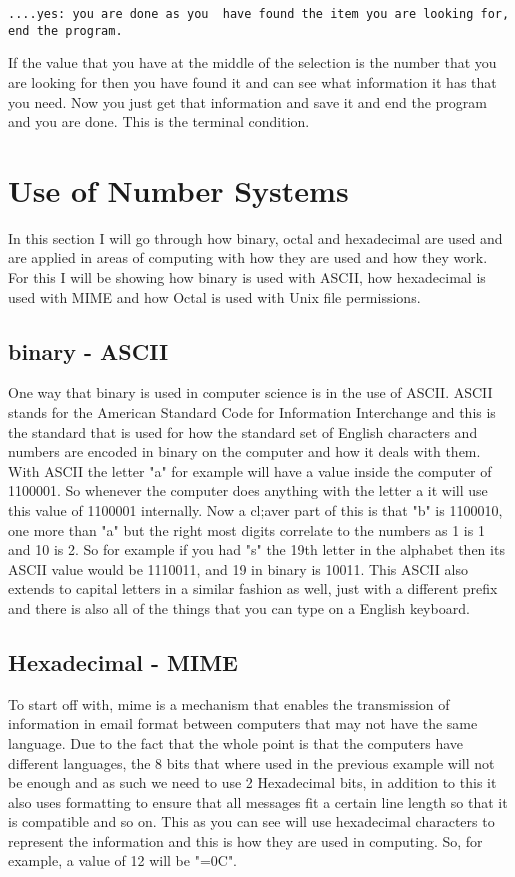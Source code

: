 \documentclass{article}
\begin{document}
\begin{verbatim}
....yes: you are done as you  have found the item you are looking for, end the program. 
\end{verbatim}
If the value that you have at the middle of the selection is the number that you are looking for then you have found it and can see what information it has that you need. Now you just get that information and save it and end the program and you are done. This is the terminal condition. 

\section{Use of Number Systems}
In this section I will go through how binary, octal and hexadecimal are used and are applied in areas of computing with how they are used and how they work. For this I will be showing how binary is used with ASCII, how hexadecimal is used with MIME and how Octal is used with Unix file permissions. 
\subsection{binary - ASCII}
One way that binary is used in computer science is in the use of ASCII. ASCII stands for the American Standard Code for Information Interchange and this is the standard that is used for how the standard set of English characters and numbers are encoded in binary on the computer and how it deals with them. With ASCII the letter "a" for example will have a value inside the computer of 1100001. So whenever the computer does anything with the letter a it will use this value of 1100001 internally. Now a cl;aver part of this is that "b" is 1100010, one more than "a" but the right most digits correlate to the numbers as 1 is 1 and 10 is 2. So for example if you had "s" the 19th letter in the alphabet then its ASCII value would be 1110011, and 19 in binary is 10011. This ASCII also extends to capital letters in a similar fashion as well, just with a different prefix and there is also all of the things that you can type on a English keyboard.  
\subsection{Hexadecimal - MIME}
To start off with, mime is a mechanism that enables the transmission of information in email format between computers that may not have the same language. Due to the fact that the whole point is that the computers have different languages, the 8 bits that where used in the previous example will not be enough and as such we need to use 2 Hexadecimal bits, in addition to this it also uses formatting to ensure that all messages fit a certain line length so that it is compatible and so on. This as you can see will use hexadecimal characters to represent the information and this is how they are used in computing. So, for example, a value of 12 will be "=0C". 
\end{document}
